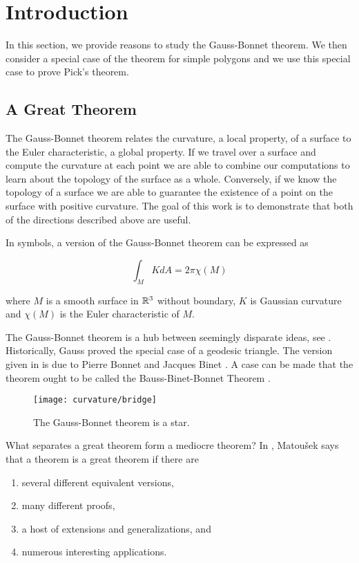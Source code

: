 \section{Introduction}
\label{sec:intro}

In this section, we provide reasons to study the Gauss-Bonnet theorem. We then consider a special case of the theorem for simple polygons and we use this special case to prove Pick's theorem.

\subsection{A Great Theorem}
The Gauss-Bonnet theorem relates the curvature, a local property, of a surface
to the Euler characteristic, a global property. If we travel over a surface and compute the curvature
at each point we are able to combine our computations to learn about the topology of the surface
as a whole. Conversely, if we know the topology of a surface we are able to 
guarantee the existence of a point on the surface with positive curvature. 
The goal of this work is to demonstrate that both of the directions described above are useful.


In symbols, a version of the Gauss-Bonnet theorem can be expressed as

\begin{theorem}\label{thm:g-b-noboundary}
		$$\int_MK dA =2\pi \chi(M)$$
\end{theorem}
where $M$ is a smooth surface in $\mathbb{R}^3$ without boundary, $K$ is Gaussian curvature
and $\chi(M)$ is the Euler characteristic of $M$.


The Gauss-Bonnet theorem is a hub between seemingly disparate ideas, see . 
Historically,  Gauss proved the special case of a geodesic triangle\cite{dombrowski-79,gauss_disquisitiones_1827}.  
The version given in  is due to Pierre Bonnet
and Jacques Binet \cite{bonnet1848memoire}. A case can be made that the theorem
ought to be called the Bauss-Binet-Bonnet Theorem
\cite{wu_historical_2008}.

\begin{figure}[htb]
\centering
\texttt{[image: curvature/bridge]}
\caption{The Gauss-Bonnet theorem is a star.}
\label{fig:bridge}
\end{figure}

What separates a great theorem form a mediocre theorem?
In \cite{jm08}, Matou\v{s}ek says that a theorem is a great theorem if there are
\begin{enumerate}[(1)]
\item several different equivalent versions,
\item many different proofs,
\item a host of extensions and generalizations, and
\item numerous interesting applications.
\end{enumerate}

